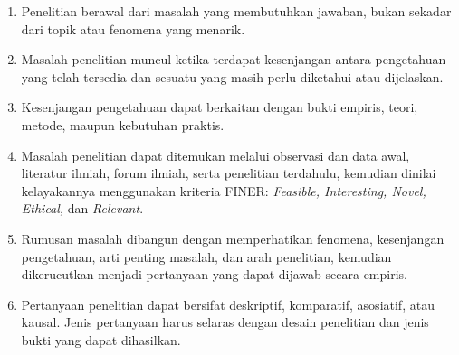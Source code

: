 \documentclass[
  indonesian,
  letterpaper,
  DIV=11,
  numbers=noendperiod]{scrreprt}
\providecommand{\tightlist}{%
  \setlength{\itemsep}{0pt}\setlength{\parskip}{0pt}}
\begin{document}
\begin{tcolorbox}[enhanced jigsaw, colframe=quarto-callout-tip-color-frame, toptitle=1mm, breakable, leftrule=.75mm, arc=.35mm, toprule=.15mm, colback=white, colbacktitle=quarto-callout-tip-color!10!white, bottomtitle=1mm, bottomrule=.15mm, titlerule=0mm, title=\textcolor{quarto-callout-tip-color}{\faLightbulb}\hspace{0.5em}{Rangkuman}, coltitle=black, left=2mm, opacitybacktitle=0.6, opacityback=0, rightrule=.15mm]

\begin{enumerate}
\def\labelenumi{\arabic{enumi}.}
\tightlist
\item
  Penelitian berawal dari masalah yang membutuhkan jawaban, bukan
  sekadar dari topik atau fenomena yang menarik.
\item
  Masalah penelitian muncul ketika terdapat kesenjangan antara
  pengetahuan yang telah tersedia dan sesuatu yang masih perlu diketahui
  atau dijelaskan.
\item
  Kesenjangan pengetahuan dapat berkaitan dengan bukti empiris, teori,
  metode, maupun kebutuhan praktis.
\item
  Masalah penelitian dapat ditemukan melalui observasi dan data awal,
  literatur ilmiah, forum ilmiah, serta penelitian terdahulu, kemudian
  dinilai kelayakannya menggunakan kriteria FINER: \emph{Feasible,
  Interesting, Novel, Ethical,} dan \emph{Relevant}.
\item
  Rumusan masalah dibangun dengan memperhatikan fenomena, kesenjangan
  pengetahuan, arti penting masalah, dan arah penelitian, kemudian
  dikerucutkan menjadi pertanyaan yang dapat dijawab secara empiris.
\item
  Pertanyaan penelitian dapat bersifat deskriptif, komparatif,
  asosiatif, atau kausal. Jenis pertanyaan harus selaras dengan desain
  penelitian dan jenis bukti yang dapat dihasilkan.
\end{enumerate}

\end{tcolorbox}
\end{document}
